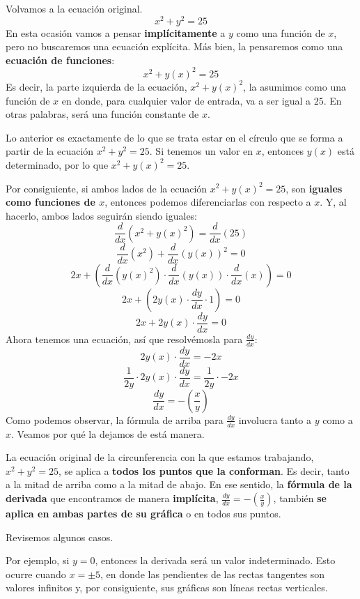 \documentclass[12pt]{article}
\begin{document}
Volvamos a la ecuación original.
\[x^{2} + y^{2} = 25\]
En esta ocasión vamos a pensar \textbf{implícitamente} a $y$ como una función de $x$, pero no buscaremos una ecuación explícita. Más bien, la pensaremos como una \textbf{ecuación de funciones}:
\[x^{2} + y(x)^{2} = 25\]
Es decir, la parte izquierda de la ecuación, $x^{2} + y(x)^{2}$, la asumimos como una función de $x$ en donde, para cualquier valor de entrada, va a ser igual a $25$. En otras palabras, será una función constante de $x$.

Lo anterior es exactamente de lo que se trata estar en el círculo que se forma a partir de la ecuación $x^{2} + y^{2} = 25$. Si tenemos un valor en $x$, entonces $y(x)$ está determinado, por lo que $x^{2} + y(x)^{2} = 25$.

Por consiguiente, si ambos lados de la ecuación $x^{2} + y(x)^{2} = 25$, son \textbf{iguales como funciones de $x$}, entonces podemos diferenciarlas con respecto a $x$. Y, al hacerlo, ambos lados seguirán siendo iguales:
\[\frac{d}{dx} (x^{2} + y(x)^{2}) = \frac{d}{dx} (25)\]
\[\frac{d}{dx}(x^{2}) + \frac{d}{dx}(y(x))^{2} = 0\]
\[2x + \left(\frac{d}{dx}(y(x)^{2}) \cdot \frac{d}{dx}(y(x)) \cdot \frac{d}{dx}(x)\right) = 0\]
\[2x + \left(2y(x) \cdot \frac{dy}{dx} \cdot 1\right) = 0\]
\[2x + 2y(x) \cdot \frac{dy}{dx} = 0\]
Ahora tenemos una ecuación, así que resolvémosla para $\frac{dy}{dx}$:
\[2y(x) \cdot \frac{dy}{dx} = -2x\]
\[\frac{1}{2y} \cdot 2y(x) \cdot \frac{dy}{dx} = \frac{1}{2y} \cdot -2x\]
\[\frac{dy}{dx} = -\left(\frac{x}{y}\right)\]
Como podemos observar, la fórmula de arriba para $\frac{dy}{dx}$ involucra tanto a $y$ como a $x$. Veamos por qué la dejamos de está manera.

La ecuación original de la circunferencia con la que estamos trabajando, $x^{2} + y^{2} = 25$, se aplica a \textbf{todos los puntos que la conforman}. Es decir, tanto a la mitad de arriba como a la mitad de abajo. En ese sentido, la \textbf{fórmula de la derivada} que encontramos de manera \textbf{implícita}, $\frac{dy}{dx} = -\left(\frac{x}{y}\right)$, también \textbf{se aplica en ambas partes de su gráfica} o en todos sus puntos.

Revisemos algunos casos.

Por ejemplo, si $y = 0$, entonces la derivada será un valor indeterminado. Esto ocurre cuando $x = \pm 5$, en donde las pendientes de las rectas tangentes son valores infinitos y, por consiguiente, sus gráficas son líneas rectas verticales.

\newpage
\end{document}
